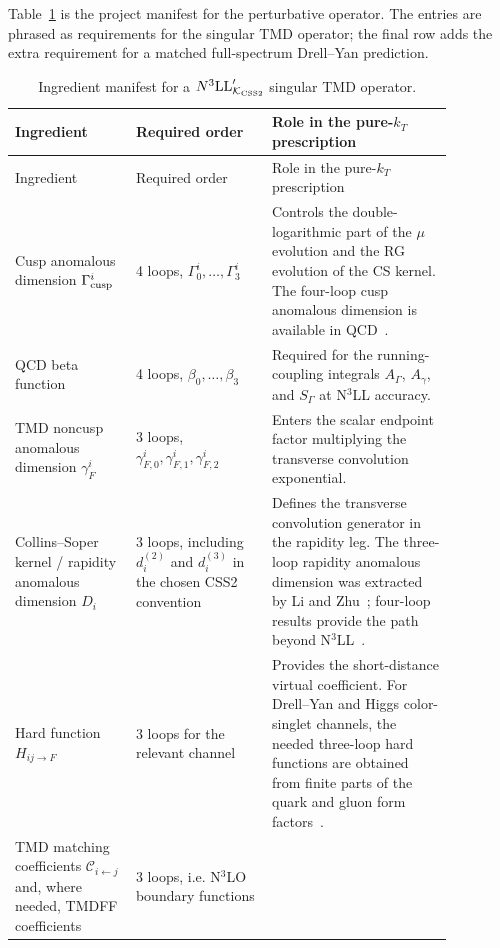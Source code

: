 \documentclass[11pt]{article}
\newcommand{\KCSS}{\mathcal K_{\rm CSS2}}
\begin{document}
Table~\ref{tab:N3LLprime-ingredients-v13} is the project manifest for the perturbative
operator.  The entries are phrased as requirements for the singular TMD operator; the final
row adds the extra requirement for a matched full-spectrum Drell--Yan prediction.

\begin{longtable}{p{0.24\linewidth} p{0.27\linewidth} p{0.36\linewidth}}
\caption{Ingredient manifest for a $N^3\mathrm{LL}'_{\KCSS}$ singular TMD operator.}\label{tab:N3LLprime-ingredients-v13}\\
\toprule
Ingredient & Required order & Role in the pure-$k_T$ prescription \\
\midrule
\endfirsthead
\toprule
Ingredient & Required order & Role in the pure-$k_T$ prescription \\
\midrule
\endhead
Cusp anomalous dimension $\Gamma_{\rm cusp}^i$ &
4 loops, $\Gamma_0^i,\ldots,\Gamma_3^i$ &
Controls the double-logarithmic part of the $\mu$ evolution and the RG evolution of the CS kernel.  The four-loop cusp anomalous dimension is available in QCD~\cite{HennKorchemskyMistlberger2020}. \\
\addlinespace
QCD beta function &
4 loops, $\beta_0,\ldots,\beta_3$ &
Required for the running-coupling integrals $A_\Gamma$, $A_\gamma$, and $S_\Gamma$ at N$^3$LL accuracy. \\
\addlinespace
TMD noncusp anomalous dimension $\gamma_F^i$ &
3 loops, $\gamma_{F,0}^i,\gamma_{F,1}^i,\gamma_{F,2}^i$ &
Enters the scalar endpoint factor multiplying the transverse convolution exponential. \\
\addlinespace
Collins--Soper kernel / rapidity anomalous dimension $D_i$ &
3 loops, including $d_i^{(2)}$ and $d_i^{(3)}$ in the chosen CSS2 convention &
Defines the transverse convolution generator in the rapidity leg.  The three-loop rapidity anomalous dimension was extracted by Li and Zhu~\cite{LiZhu2017}; four-loop results provide the path beyond N$^3$LL~\cite{MoultZhuZhu2022,DuhrMistlbergerVita2022}. \\
\addlinespace
Hard function $H_{ij\to F}$ &
3 loops for the relevant channel &
Provides the short-distance virtual coefficient.  For Drell--Yan and Higgs color-singlet channels, the needed three-loop hard functions are obtained from finite parts of the quark and gluon form factors~\cite{GehrmannGloverHuberIkizlerliStuderus2010}. \\
\addlinespace
TMD matching coefficients $\mathcal C_{i\leftarrow j}$ and, where needed, TMDFF coefficients &
3 loops, i.e. N$^3$LO boundary functions &

\end{longtable}
\end{document}
